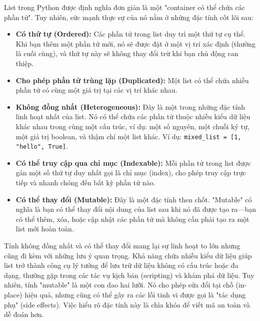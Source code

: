 \documentclass[11pt]{article}
\begin{document}
List trong Python được định nghĩa đơn giản là một "container có thể chứa các phần tử". Tuy nhiên, sức mạnh thực sự của nó nằm ở những đặc tính cốt lõi sau:
\begin{itemize}
    \item \textbf{Có thứ tự (Ordered):} Các phần tử trong list duy trì một thứ tự cụ thể. Khi bạn thêm một phần tử mới, nó sẽ được đặt ở một vị trí xác định (thường là cuối cùng), và thứ tự này sẽ không thay đổi trừ khi bạn chủ động can thiệp.
    \item \textbf{Cho phép phần tử trùng lặp (Duplicated):} Một list có thể chứa nhiều phần tử có cùng một giá trị tại các vị trí khác nhau.
    \item \textbf{Không đồng nhất (Heterogeneous):} Đây là một trong những đặc tính linh hoạt nhất của list. Nó có thể chứa các phần tử thuộc nhiều kiểu dữ liệu khác nhau trong cùng một cấu trúc, ví dụ: một số nguyên, một chuỗi ký tự, một giá trị boolean, và thậm chí một list khác. Ví dụ: \texttt{mixed\_list = [1, "hello", True]}.
    \item \textbf{Có thể truy cập qua chỉ mục (Indexable):} Mỗi phần tử trong list được gán một số thứ tự duy nhất gọi là chỉ mục (index), cho phép truy cập trực tiếp và nhanh chóng đến bất kỳ phần tử nào.
    \item \textbf{Có thể thay đổi (Mutable):} Đây là một đặc tính then chốt. "Mutable" có nghĩa là bạn có thể thay đổi nội dung của list sau khi nó đã được tạo ra—bạn có thể thêm, xóa, hoặc cập nhật các phần tử mà không cần phải tạo ra một list mới hoàn toàn.
\end{itemize}
Tính không đồng nhất và có thể thay đổi mang lại sự linh hoạt to lớn nhưng cũng đi kèm với những lưu ý quan trọng. Khả năng chứa nhiều kiểu dữ liệu giúp list trở thành công cụ lý tưởng để lưu trữ dữ liệu không có cấu trúc hoặc đa dạng, thường gặp trong các tác vụ kịch bản (scripting) và khám phá dữ liệu. Tuy nhiên, tính "mutable" là một con dao hai lưỡi. Nó cho phép sửa đổi tại chỗ (in-place) hiệu quả, nhưng cũng có thể gây ra các lỗi tinh vi được gọi là "tác dụng phụ" (side effects). Việc hiểu rõ đặc tính này là chìa khóa để viết mã an toàn và dễ đoán hơn.
\end{document}
